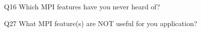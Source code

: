 \begin{description}%
\item{Q16} Which MPI features have you never heard of?%
\item{Q27} What MPI feature(s) are NOT useful for you application?%
\end{description}%
